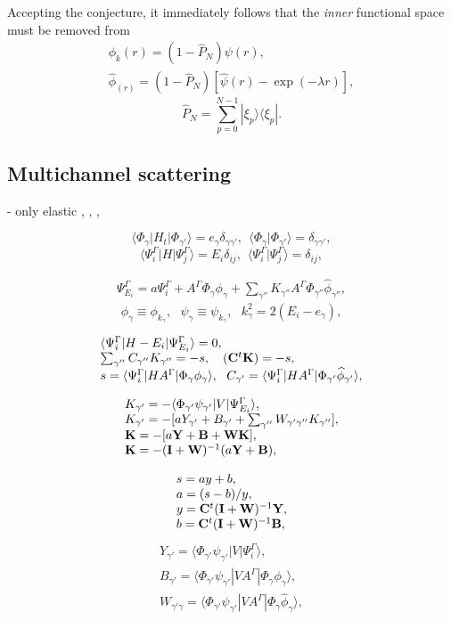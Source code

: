 \documentclass[aip
, pra
, showpacs
, aps
, twocolumn
, groupedaddress
, floatfix
]{revtex4}
\newcommand{\beq}{\begin{equation}}
\newcommand{\eeq}{\end{equation}}
\newcommand{\barr}{\begin{array}}
\newcommand{\earr}{\end{array}}
\begin{document}
Accepting the conjecture, it immediately follows that the {\em inner} functional space must be removed from
\beq \barr{l}
\phi_k(r) = (1-\hat{P}_N) \psi(r),\\
\widehat{\phi}_(r) = (1-\hat{P}_N) [\widehat{\psi}(r) - \exp{(-\lambda r)}],
\earr \eeq
\beq
\hat{P}_N = \sum_{p=0}^{N-1} | \xi_p \rangle \langle \xi_p |.
\eeq



\subsection{Multichannel scattering}
\cite{CA73} - only elastic
\cite{NO72},
\cite{TF79},
\cite{Nesbet78}, \cite{Lucchese86}

\beq
\langle \Phi_\gamma|H_t|\Phi_{\gamma'}\rangle=e_\gamma \delta_{\gamma\gamma'}, \ \
 \langle \Phi_\gamma|\Phi_{\gamma'}\rangle=\delta_{\gamma\gamma'},
 \label{psi_H_psi} \eeq
\beq
\langle\Psi_i^\Gamma|H|\Psi_j^\Gamma\rangle=E_i\delta_{ij}, \ \
 \langle\Psi_i^\Gamma|\Psi_j^\Gamma\rangle=\delta_{ij},
\label{Psi_H_Psi} \eeq


\beq \barr{l}
 \Psi_{E_i}^{\Gamma}  =  a \Psi_i^{\Gamma}
 + A^{\Gamma} \Phi_{\gamma}  \phi_{\gamma}
+ \sum_{\gamma''} K_{\gamma''} A^{\Gamma} \Phi_{\gamma''}   \widehat{\phi}_{\gamma''} ,
\earr \label{Psi_} \eeq
\beq
\phi_{\gamma}\equiv \phi_{k_\gamma}, \ \ \ \psi_{\gamma}\equiv \psi_{k_\gamma}, \ \ \   k_{\gamma}^2 = 2(E_i - e_\gamma),
\eeq


\beq \barr{l}
\langle\Psi_i^\Gamma|H-E_i|\Psi_{E_i}^{\Gamma}\rangle=0,\\
\sum_{\gamma''}  C_{\gamma''} K_{\gamma''}  = -s
, \ \ \ ({\bf C}^t {\bf K}) = -s,\\
s = \langle \Psi_i^\Gamma |HA^{\Gamma} |\Phi_{\gamma} \phi_{\gamma} \rangle,\ \
C_{\gamma'} =  \langle \Psi_i^\Gamma |HA^{\Gamma} |\Phi_{\gamma'} \widehat{\phi}_{\gamma'} \rangle,
\earr \label{Psi_} \eeq

\beq \barr{l}
K_{\gamma'} = - \langle \Phi_{\gamma'}  \psi_{\gamma'}
| V | \Psi_{E_i}^{ \Gamma} \rangle,\\
K_{\gamma'} =   - [a Y_{\gamma'}   + B_{\gamma'}
+ \sum_{\gamma''}  W_{\gamma' \gamma''} K_{\gamma''}],\\
{\bf K} =   -[a {\bf Y} + {\bf B} + {\bf W K}],\\
{\bf K}  = -({\bf I}+{\bf W})^{-1}   (a {\bf Y}    + {\bf B}),
\earr \eeq

\beq \barr{l}
s = a y  + b,   \\
a = (s - b) / y,\\
y = {\bf C}^t ({\bf I}+{\bf W})^{-1}  {\bf Y}, \\
b = {\bf C}^t ({\bf I}+{\bf W})^{-1}  {\bf B},
\earr \eeq
\beq \barr{l}
Y_{\gamma'} = \langle \Phi_{\gamma'}  \psi_{\gamma'} |V |\Psi_i^{\Gamma} \rangle,\\
B_{\gamma'} = \langle \Phi_{\gamma'}  \psi_{\gamma'} |V A^{\Gamma} |\Phi_{\gamma} \phi_{\gamma} \rangle,\\
W_{\gamma' \gamma} = \langle \Phi_{\gamma'}  \psi_{\gamma'} |V A^{\Gamma} |\Phi_{\gamma} \widehat{\phi}_{\gamma} \rangle,\\
\earr \label{Psi_} \eeq
\end{document}
